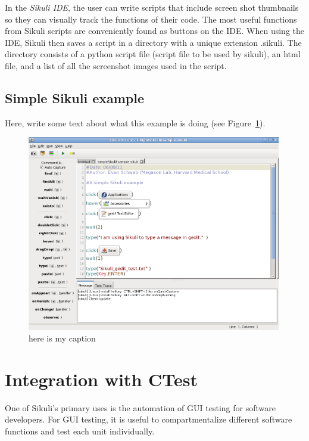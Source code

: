 \documentclass{InsightArticle}
\begin{document}
In the \emph{Sikuli IDE}, the user can write scripts that include screen shot
thumbnails so they can visually track the functions of their code. The most
useful functions from Sikuli scripts are conveniently found as
buttons on the IDE. When using the IDE, Sikuli then saves a script in a
directory with a unique extension .sikuli. The directory consists of a python
script file (script file to be used by sikuli), an html file, and a list of all
the screenshot images used in the script.


\subsection{Simple Sikuli example} %

Here, write some text about what this example is doing
(see Figure~\ref{fig:SimpleExample}).

\begin{figure}[htbp]
 \centering
 \includegraphics[width=0.99\textwidth]{Images/SimpleSikuliExample.png}
 \caption{here is my caption}
 \label{fig:SimpleExample}
\end{figure}

\section{Integration with CTest}

One of Sikuli's primary uses is the automation of GUI testing for software
developers. For GUI testing, it is useful to compartmentalize different software
functions and test each unit individually.\\
\end{document}
